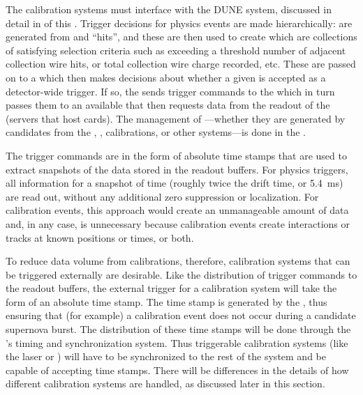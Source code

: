 
The calibration systems must interface with the DUNE  system, discussed in detail in \spchdaq of this .
Trigger decisions for physics events are made %
hierarchically:  are generated from  and  ``hits'', and these  are then used to create  which are collections of  satisfying selection criteria such as exceeding a threshold number of adjacent collection wire hits, or total collection wire charge recorded, etc. These  are passed on to a  which then makes decisions about whether a given  is accepted as a detector-wide trigger.  If so, the  sends trigger commands to the  which in turn passes them to an available  that then requests data from the  readout of the  (servers that host  cards). The management of ---whether they are generated by candidates from the , , calibrations, or other systems---is done in the . 

The trigger commands are in the form of absolute time stamps that are used to extract snapshots of the data stored in the  readout buffers. For physics triggers, all  information for a snapshot of time (roughly twice the drift time, or \SI{5.4}{\milli\s}) are read out, without any additional zero suppression or localization. For calibration events, this approach would create an unmanageable amount of data and, in any case, is unnecessary because calibration events create interactions or tracks at known positions or times, or both.


To reduce data volume from calibrations, therefore, calibration systems that can be triggered externally are desirable. Like the distribution of trigger commands to the  readout buffers, the external trigger for a calibration system will take the form of an absolute time stamp. The time stamp is generated by the , thus ensuring that (for example) a calibration event does not occur during a candidate supernova burst.  The distribution of these time stamps will be done through the 's timing and synchronization system. Thus triggerable calibration systems (like the laser or ) will have to be synchronized to the rest of the  system and be capable of accepting time stamps. There will be differences in the details of how different calibration systems are handled, as discussed later in this section. 

